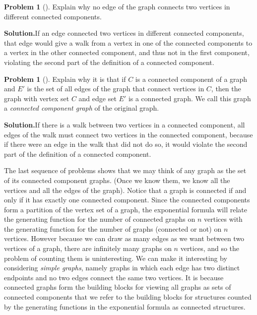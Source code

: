\documentclass[10pt,]{book}
\theoremstyle{plain}
\theoremstyle{definition}
\newtheorem{activity}[project]{Problem}
\theoremstyle{definition}
\numberwithin{equation}{chapter}
\begin{document}
\begin{activity}[]\label{activity-419}
Explain why no edge of the graph connects two vertices in different connected components.%
\par\medskip\noindent%
\textbf{Solution.}\quad If an edge connected two vertices in different connected components, that edge would give a walk from a vertex in one of the connected components to a vertex in the other connected component, and thus not in the first component, violating the second part of the definition of a connected component.%
\end{activity}
\begin{activity}[]\label{activity-420}
Explain why it is that if \(C\) is a connected component of a graph and \(E'\) is the set of all edges of the graph that connect vertices in \(C\), then the graph with vertex set \(C\) and edge set \(E'\) is a connected graph. We call this graph a \emph{connected component graph} of the original graph.%
\par\medskip\noindent%
\textbf{Solution.}\quad If there is a walk between two vertices in a connected component, all edges of the walk must connect two vertices in the connected component, because if there were an edge in the walk that did not do so, it would violate the second part of the definition of a connected component.%
\end{activity}
The last sequence of problems shows that we may think of any graph as the set of its connected component graphs. (Once we know them, we know all the vertices and all the edges of the graph). Notice that a graph is connected if and only if it has exactly one connected component. Since the connected components form a partition of the vertex set of a graph, the exponential formula will relate the generating function for the number of connected graphs on \(n\) vertices with the generating function for the number of graphs (connected or not) on \(n\) vertices. However because we can draw as many edges as we want between two vertices of a graph, there are infinitely many graphs on \(n\) vertices, and so the problem of counting them is uninteresting. We can make it interesting by considering \emph{simple graphs}, namely graphs in which each edge has two distinct endpoints and no two edges connect the same two vertices. It is because connected graphs form the building blocks for viewing all graphs as sets of connected components that we refer to the building blocks for structures counted by the generating functions in the exponential formula as connected structures.%
\end{document}
